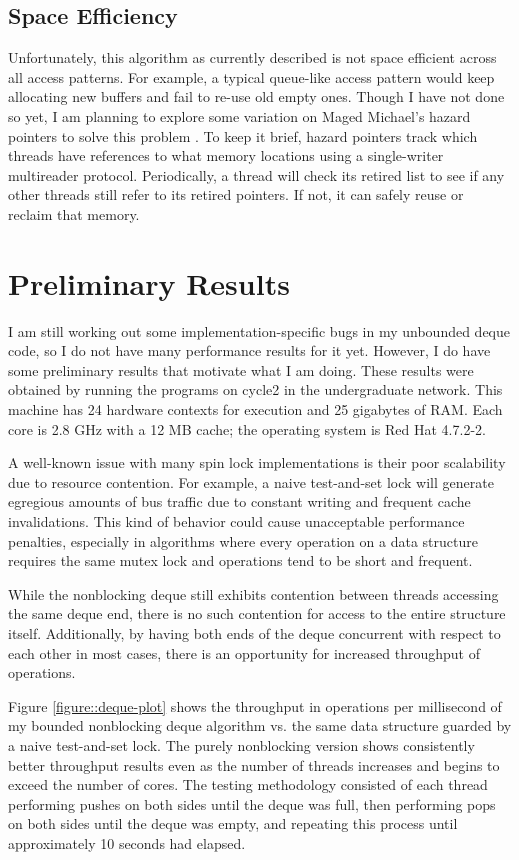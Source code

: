 \documentclass[11pt, letterpaper]{article}
\begin{document}
        \subsection{Space Efficiency}
            Unfortunately, this algorithm as currently described is not space efficient across all access patterns. For example, a typical queue-like access pattern would keep allocating new buffers and fail to re-use old empty ones. Though I have not done so yet, I am planning to explore some variation on Maged Michael's hazard pointers to solve this problem \cite{hazard}. To keep it brief, hazard pointers track which threads have references to what memory locations using a single-writer multireader protocol. Periodically, a thread will check its retired list to see if any other threads still refer to its retired pointers. If not, it can safely reuse or reclaim that memory.

    \section{Preliminary Results}
        I am still working out some implementation-specific bugs in my unbounded deque code, so I do not have many performance results for it yet. However, I do have some preliminary results that motivate what I am doing. These results were obtained by running the programs on cycle2 in the undergraduate network. This machine has 24 hardware contexts for execution and 25 gigabytes of RAM. Each core is 2.8 GHz with a 12 MB cache; the operating system is Red Hat 4.7.2-2.

        A well-known issue with many spin lock implementations is their poor scalability due to resource contention. For example, a naive test-and-set lock will generate egregious amounts of bus traffic due to constant writing and frequent cache invalidations. This kind of behavior could cause unacceptable performance penalties, especially in algorithms where every operation on a data structure requires the same mutex lock and operations tend to be short and frequent.

        While the nonblocking deque still exhibits contention between threads accessing the same deque end, there is no such contention for access to the entire structure itself. Additionally, by having both ends of the deque concurrent with respect to each other in most cases, there is an opportunity for increased throughput of operations.

        Figure \ref{figure::deque-plot} shows the throughput in operations per millisecond of my bounded nonblocking deque algorithm vs. the same data structure guarded by a naive test-and-set lock. The purely nonblocking version shows consistently better throughput results even as the number of threads increases and begins to exceed the number of cores. The testing methodology consisted of each thread performing pushes on both sides until the deque was full, then performing pops on both sides until the deque was empty, and repeating this process until approximately 10 seconds had elapsed.
\end{document}
